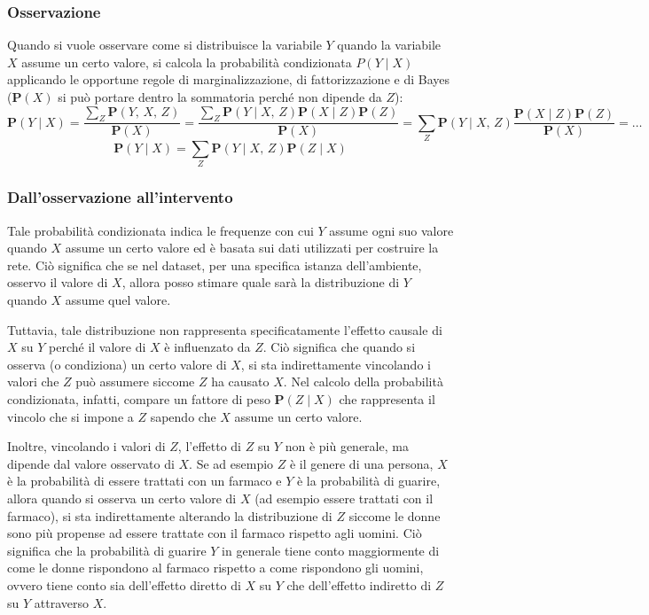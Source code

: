 \subsubsection*{Osservazione}
Quando si vuole osservare come si distribuisce la variabile \(Y\) quando la variabile \(X\) assume un certo valore, si calcola
la probabilità condizionata \(P(Y \mid X)\) applicando le opportune regole di marginalizzazione, di fattorizzazione e di Bayes
(\(\textbf{P}(X)\) si può portare dentro la sommatoria perché non dipende da \(Z\)):
\[\textbf{P}(Y \mid X) = \frac{\sum_{Z} \textbf{P}(Y, \, X, \, Z)}{\textbf{P}(X)} = \frac{\sum_{Z} \textbf{P}(Y \mid X, \, Z) \textbf{P}(X \mid Z) \textbf{P}(Z)}{\textbf{P}(X)} = \sum_{Z} \textbf{P}(Y \mid X, \, Z) \frac{\textbf{P}(X \mid Z) \textbf{P}(Z)}{\textbf{P}(X)} = \dots\]
\[\textbf{P}(Y \mid X) = \sum_{Z} \textbf{P}(Y \mid X, \, Z) \textbf{P}(Z \mid X)\]

\subsubsection*{Dall'osservazione all'intervento}
Tale probabilità condizionata indica le frequenze con cui \(Y\) assume ogni suo valore quando \(X\) assume un certo valore ed è
basata sui dati utilizzati per costruire la rete. Ciò significa che se nel dataset, per una specifica istanza dell'ambiente,
osservo il valore di \(X\), allora posso stimare quale sarà la distribuzione di \(Y\) quando \(X\) assume quel valore.

Tuttavia, tale distribuzione non rappresenta specificatamente l'effetto causale di \(X\) su \(Y\) perché il valore di \(X\)
è influenzato da \(Z\). Ciò significa che quando si osserva (o condiziona) un certo valore di \(X\), si sta indirettamente
vincolando i valori che \(Z\) può assumere siccome \(Z\) ha causato \(X\). Nel calcolo della probabilità condizionata, infatti,
compare un fattore di peso \(\textbf{P}(Z \mid X)\) che rappresenta il vincolo che si impone a \(Z\) sapendo che \(X\) assume
un certo valore.

Inoltre, vincolando i valori di \(Z\), l'effetto di \(Z\) su \(Y\) non è più generale, ma dipende dal valore osservato di \(X\).
Se ad esempio \(Z\) è il genere di una persona, \(X\) è la probabilità di essere trattati con un farmaco e \(Y\) è la probabilità
di guarire, allora quando si osserva un certo valore di \(X\) (ad esempio essere trattati con il farmaco), si sta indirettamente
alterando la distribuzione di \(Z\) siccome le donne sono più propense ad essere trattate con il farmaco rispetto agli uomini.
Ciò significa che la probabilità di guarire \(Y\) in generale tiene conto maggiormente di come le donne rispondono al farmaco
rispetto a come rispondono gli uomini, ovvero tiene conto sia dell'effetto diretto di \(X\) su \(Y\) che dell'effetto indiretto
di \(Z\) su \(Y\) attraverso \(X\).

